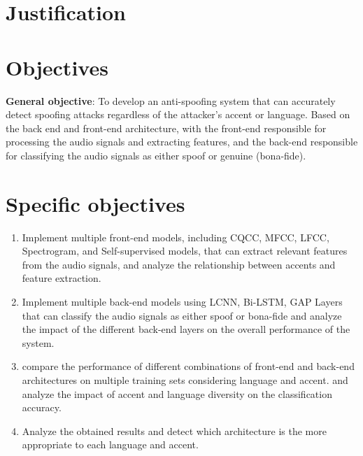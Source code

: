 \section{Justification}



\section{Objectives}

\textbf{General objective}: To develop an anti-spoofing system that can accurately detect spoofing attacks regardless of the attacker's accent or language. Based on the back end and front-end architecture, with the front-end responsible for processing the audio signals and extracting features, and the back-end responsible for classifying the audio signals as either spoof or genuine (bona-fide). 

\section{Specific objectives}

\begin{enumerate}
    \item Implement multiple front-end models, including CQCC, MFCC, LFCC, Spectrogram, and Self-supervised models, that can extract relevant features from the audio signals, and analyze the relationship between accents and feature extraction.
    \item Implement multiple back-end models using LCNN, Bi-LSTM, GAP Layers that can classify the audio signals as either spoof or bona-fide and analyze the impact of the different back-end layers on the overall performance of the system.
    \item compare the performance of different combinations of front-end and back-end architectures on multiple training sets considering language and accent. and analyze the impact of accent and language diversity on the classification accuracy.
    \item Analyze the obtained results and detect which architecture is the more appropriate to each language and accent.
\end{enumerate}




\endinput

